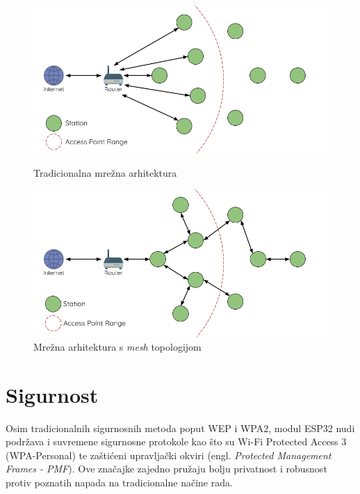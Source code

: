 \begin{figure}[ht]
	\begin{minipage}[t]{0.4\textwidth}
		\includegraphics[width=\linewidth]{imgs/traditional_arch}
		\caption{Tradicionalna mrežna arhitektura \cite{espressif}}
		\label{fig:traditional_arch}
	\end{minipage}
	\hspace*{\fill}
	\begin{minipage}[t]{0.4\textwidth}
		\includegraphics[width=\linewidth]{imgs/mesh_arch}
		\caption{Mrežna arhitektura s \textit{mesh} topologijom \cite{espressif}}
		\label{fig:mesh_arch}
	\end{minipage}
\end{figure}


\section{Sigurnost}

Osim tradicionalnih sigurnosnih metoda poput WEP i WPA2, modul ESP32 nudi podržava i suvremene sigurnosne protokole  kao što su Wi-Fi Protected Access 3 (WPA-Personal) te zaštićeni upravljački okviri (engl. \textit{Protected Management Frames - PMF}). Ove značajke zajedno pružaju bolju privatnost i robusnost protiv poznatih napada na tradicionalne načine rada.

